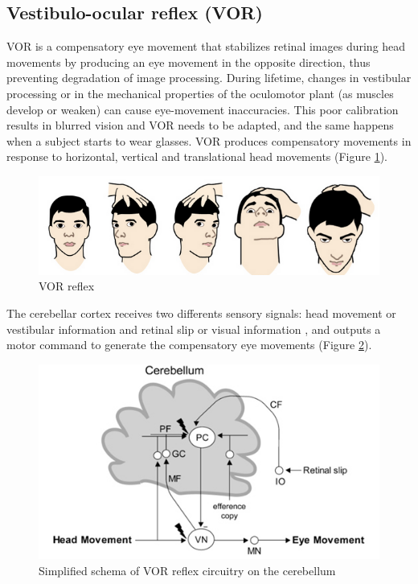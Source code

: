 \documentclass[12pt, a4paper,twoside]{tesi_upf}
\begin{document}
\subsection{Vestibulo-ocular reflex (VOR)}

VOR is a compensatory eye movement that stabilizes retinal images during head movements by producing an eye movement in the opposite direction, thus preventing degradation of image processing. During lifetime, changes in vestibular processing or in the mechanical properties of the oculomotor plant (as muscles develop or weaken) can cause eye-movement inaccuracies. This poor calibration results in blurred vision and VOR needs to be adapted, and the same happens when a subject starts to wear glasses. VOR produces compensatory movements in response to horizontal, vertical and translational head movements (Figure \ref {fig:vor}).

\begin{figure}
  \centering
  \includegraphics[scale=0.70]{images/vor.png}
  \caption[VOR reflex]{VOR reflex}
  \label{fig:vor}
\end{figure}

The cerebellar cortex receives two differents sensory signals: head movement or vestibular information and retinal slip or visual information \cite{Boyden2004}, and outputs a motor command to generate the compensatory eye movements (Figure \ref {fig:vorboyden}).

\begin{figure}
  \centering
  \includegraphics[scale=0.70]{images/boyden.png}
  \caption[Simplified schema of VOR reflex circuitry on the cerebellum]{Simplified schema of VOR reflex circuitry on the cerebellum}
  \label{fig:vorboyden}
\end{figure}
\end{document}
